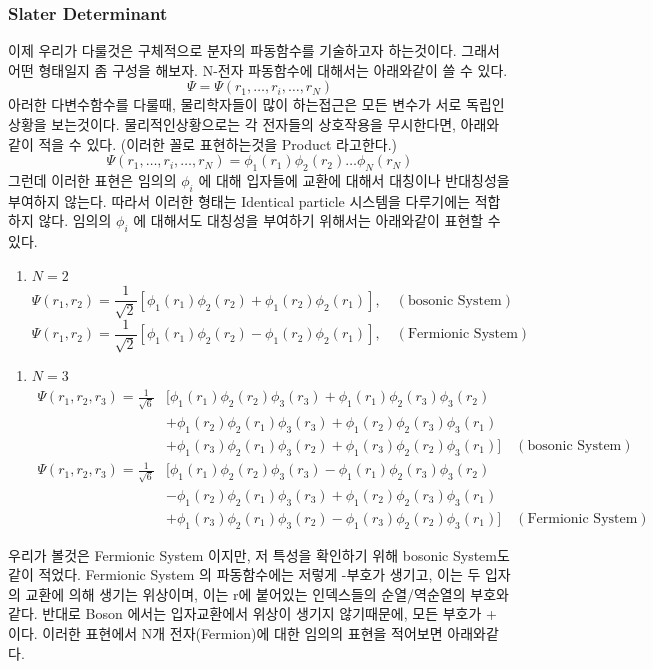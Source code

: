 \documentclass[10pt]{article}
\begin{document}
\subsubsection{Slater Determinant}
이제 우리가 다룰것은 구체적으로 분자의 파동함수를 기술하고자 하는것이다. 그래서 어떤 형태일지 좀 구성을 해보자.
N-전자 파동함수에 대해서는 아래와같이 쓸 수 있다. 
\[
\Psi = \Psi(r_1, \dots, r_i, \dots, r_N)
\]
아러한 다변수함수를 다룰때, 물리학자들이 많이 하는접근은 모든 변수가 서로 독립인 상황을 보는것이다. 
물리적인상황으로는 각 전자들의 상호작용을 무시한다면, 아래와같이 적을 수 있다. (이러한 꼴로 표현하는것을  Product 라고한다.)
\[
\Psi(r_1, \dots, r_i, \dots, r_N)=\phi_1(r_1)\phi_2(r_2)\dots\phi_N(r_N)
\]
그런데 이러한 표현은 임의의 \(\phi_i\) 에 대해 입자들에 교환에 대해서 대칭이나 반대칭성을 부여하지 않는다. 
따라서 이러한 형태는 Identical particle 시스템을 다루기에는 적합하지 않다. 
임의의 \(\phi_i\) 에 대해서도 대칭성을 부여하기 위해서는 아래와같이 표현할 수 있다.
\begin{enumerate}[label=\(\mathrm{i}\))]
\item {\(N=2\)}
\[
\Psi(r_1,r_2)=\frac{1}{\sqrt{2}}[\phi_1(r_1)\phi_2(r_2)+\phi_1(r_2)\phi_2(r_1)],\quad (\text{bosonic System})
\]
\[
\Psi(r_1,r_2)=\frac{1}{\sqrt{2}}[\phi_1(r_1)\phi_2(r_2)-\phi_1(r_2)\phi_2(r_1)],\quad (\text{Fermionic System})
\]
\end{enumerate}
\begin{enumerate}[label=\(\mathrm{ii}\))]
\item {\(N=3\)}
\begin{align*}
\Psi(r_1,r_2,r_3)=\frac{1}{\sqrt{6}}&[\phi_1(r_1)\phi_2(r_2)\phi_3(r_3)+\phi_1(r_1)\phi_2(r_3)\phi_3(r_2) \\
&+\phi_1(r_2)\phi_2(r_1)\phi_3(r_3)+\phi_1(r_2)\phi_2(r_3)\phi_3(r_1)\\
&+\phi_1(r_3)\phi_2(r_1)\phi_3(r_2)+\phi_1(r_3)\phi_2(r_2)\phi_3(r_1)]\quad (\text{bosonic System})
\end{align*}
\begin{align*}
\Psi(r_1,r_2,r_3)=\frac{1}{\sqrt{6}}&[\phi_1(r_1)\phi_2(r_2)\phi_3(r_3)-\phi_1(r_1)\phi_2(r_3)\phi_3(r_2) \\
&-\phi_1(r_2)\phi_2(r_1)\phi_3(r_3)+\phi_1(r_2)\phi_2(r_3)\phi_3(r_1)\\
&+\phi_1(r_3)\phi_2(r_1)\phi_3(r_2)-\phi_1(r_3)\phi_2(r_2)\phi_3(r_1)]\quad (\text{Fermionic System})
\end{align*}
\end{enumerate}
우리가 볼것은 Fermionic System 이지만, 저 특성을 확인하기 위해 bosonic System도 같이 적었다. 
Fermionic System 의 파동함수에는 저렇게 -부호가 생기고, 이는 두 입자의 교환에 의해 생기는 위상이며, 이는 r에 붙어있는 인덱스들의 순열/역순열의 부호와 같다. 
반대로 Boson 에서는 입자교환에서 위상이 생기지 않기때문에, 모든 부호가 + 이다.
이러한 표현에서 N개 전자(Fermion)에 대한 임의의 표현을 적어보면 아래와같다. 
\end{document}

